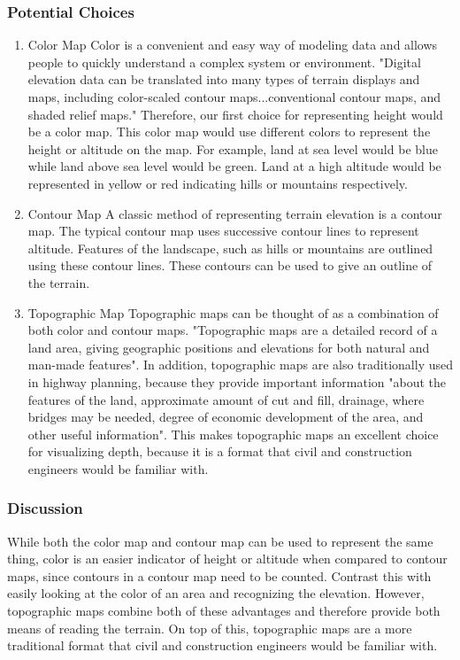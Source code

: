 \subsubsection{Potential Choices}
\begin{enumerate}
\item{Color Map}
Color is a convenient and easy way of modeling data and allows people to quickly understand a complex system or environment.
"Digital elevation data can be translated into many types of terrain displays and maps, including color-scaled contour maps...conventional contour maps, and shaded relief maps."
Therefore, our first choice for representing height would be a color map.
This color map would use different colors to represent the height or altitude on the map.
For example, land at sea level would be blue while land above sea level would be green.
Land at a high altitude would be represented in yellow or red indicating hills or mountains respectively.

\item{Contour Map}
A classic method of representing terrain elevation is a contour map.
The typical contour map uses successive contour lines to represent altitude.
Features of the landscape, such as hills or mountains are outlined using these contour lines.
These contours can be used to give an outline of the terrain.

\item{Topographic Map}
Topographic maps can be thought of as a combination of both color and contour maps.
"Topographic maps are a detailed record of a land area, giving geographic positions and elevations for both natural and man-made features".
In addition, topographic maps are also traditionally used in highway planning, because they provide important information "about the features of the land, approximate amount of cut and fill, drainage, where bridges may be needed, degree of economic development of the area, and other useful information".
This makes topographic maps an excellent choice for visualizing depth, because it is a format that civil and construction engineers would be familiar with.
\end{enumerate}
\subsubsection{Discussion}
While both the color map and contour map can be used to represent the same thing, color is an easier indicator of height or altitude when compared to contour maps, since contours in a contour map need to be counted.
Contrast this with easily looking at the color of an area and recognizing the elevation.
However, topographic maps combine both of these advantages and therefore provide both means of reading the terrain.
On top of this, topographic maps are a more traditional format that civil and construction engineers would be familiar with.

